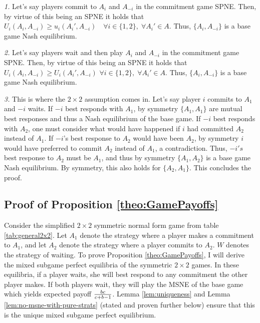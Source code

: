 \documentclass[main.tex]{subfiles}
\begin{document}
\textit{1.} Let's say players commit to $A_i$ and $A_{-i}$ in the commitment game SPNE. Then, by virtue of this being an SPNE it holds that $U_i(A_i,A_{-i})\geq u_i(A_i',A_{-i})\quad \forall i\in\{1,2\},\; \forall A_i'\in A$. Thus, $\{A_i,A_{-i}\}$ is a base game Nash equilibrium.
 
\textit{2.} Let's say players wait and then play $A_i$ and $A_{-i}$ in the commitment game SPNE. Then, by virtue of this being an SPNE it holds that $U_i(A_i,A_{-i})\geq U_i(A_i',A_{-i})$ $\forall i\in\{1,2\},\; \forall A_i'\in A$. Thus, $\{A_i,A_{-i}\}$ is a base game Nash equilibrium.
 
\textit{3.} This is where the $2\times2$ assumption comes in. Let's say player $i$ commits to $A_1$ and $-i$ waits. If $-i$ best responds with $A_1$,  by symmetry $\{A_1,A_1\}$ are mutual best responses and thus a Nash equilibrium of the base game. If $-i$ best responds with $A_2$, one must consider what would have happened if $i$ had committed $A_2$ instead of $A_1$. If $-i$'s best response to $A_2$ would have been $A_2$, by symmetry $i$ would have preferred to commit $A_2$ instead of $A_1$, a contradiction. Thus, $-i's$ best response to $A_2$ must be $A_1$, and thus by symmetry $\{A_1,A_2\}$ is a base game Nash equilibrium. By symmetry, this also holds for $\{A_2,A_1\}$. This concludes the proof.
 
\subsection{Proof of Proposition \ref{theo:GamePayoffs}}\label{sec:prooftheo1}
Consider the simplified $2\times2$ symmetric normal form game from table \ref{tab:general2x2}. Let $A_{1}$ denote the strategy where a player makes a commitment to $A_1$, and let $A_{2}$ denote the strategy where a player commits to $A_2$. $W$ denotes the strategy of waiting. 
To prove Proposition \ref{theo:GamePayoffs}, I will derive the mixed subgame perfect equilibria of the symmetric $2\times2$ games. In these equilibria, if a player waits, she will best respond to any commitment the other player makes. If both players wait, they will play the MSNE of the base game which yields expected payoff $\tfrac{bc}{c+b-1}$. 
Lemma \ref{lem:uniqueness} and Lemma \ref{lem:no-msne-with-pure-strats} (stated and proven further below) ensure that this is the unique mixed subgame perfect equilibrium. 
 
\end{document}
